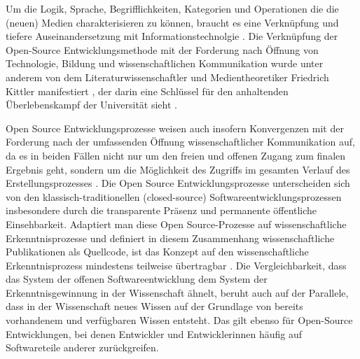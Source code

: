 Um die Logik, Sprache, Begrifflichkeiten, Kategorien und Operationen die die (neuen) Medien charakterisieren zu können, braucht es eine Verknüpfung und tiefere Auseinandersetzung mit Informationstechnolgie \cite[:65]{manovich_2001_language}. Die Verknüpfung der Open-Source Entwicklungsmethode mit der Forderung nach Öffnung von Technologie, Bildung und wissenschaftlichen Kommunikation wurde unter anderem von dem Literaturwissenschaftler und Medientheoretiker Friedrich Kittler manifestiert \cite{cite:1}, der darin eine Schlüssel für den anhaltenden Überlebenskampf der Universität sieht \cite[:7]{chun_2006_new}.

Open Source Entwicklungsprozesse weisen auch insofern Konvergenzen mit der Forderung nach der umfassenden Öffnung wissenschaftlicher Kommunikation auf, da es in beiden Fällen nicht nur um den freien und offenen Zugang zum finalen Ergebnis geht, sondern um die Möglichkeit des Zugriffs im gesamten Verlauf des Erstellungsprozesses \cite{kelty_2004}. Die Open Source Entwicklungsprozesse unterscheiden sich von den klassisch-traditionellen (closed-source) Softwareentwicklungsprozessen insbesondere durch die transparente Präsenz und permanente öffentliche Einsehbarkeit. Adaptiert man diese Open Source-Prozesse auf wissenschaftliche Erkenntnisprozesse und definiert in diesem Zusammenhang wissenschaftliche Publikationen als Quellcode, ist das Konzept auf den wissenschaftliche Erkenntnisprozess mindestens teilweise übertragbar \cite{garcia_2010_open} \cite{Singh_2008} \cite{Bradley_2008} \cite{mantz_2007_open} \cite{dorschel_2006_open} \cite{Bradley_2007} \cite{Willinsky_2005}. Die Vergleichbarkeit, dass das System der offenen Softwareentwicklung dem System der Erkenntnisgewinnung in der Wissenschaft ähnelt, beruht auch auf der Parallele, dass in der Wissenschaft neues Wissen auf der Grundlage von bereits vorhandenem und verfügbaren Wissen entsteht. Das gilt ebenso für Open-Source Entwicklungen, bei denen Entwickler und Entwicklerinnen häufig auf Softwareteile anderer zurückgreifen.

